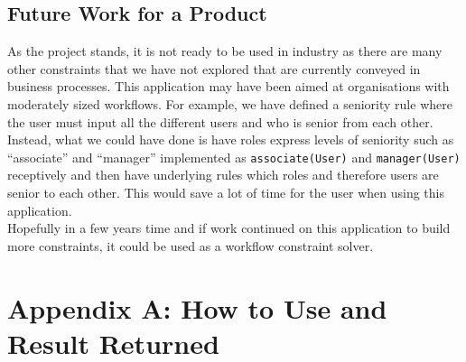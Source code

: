 \documentclass[a4paper]{report}
\begin{document}
\section{Future Work for a Product}
As the project stands, it is not ready to be used in industry as there are many other constraints that we have not explored that are currently conveyed in business processes. This application may have been aimed at organisations with moderately sized workflows. For example, we have defined a seniority rule where the user must input all the different users and who is senior from each other. Instead, what we could have done is have roles express levels of seniority such as ``associate'' and ``manager'' implemented as \texttt{associate(User)} and \texttt{manager(User)} receptively and then have underlying rules which roles and therefore users are senior to each other. This would save a lot of time for the user when using this application.\\

Hopefully in a few years time and if work continued on this application to build more constraints, it could be used as a workflow constraint solver. \\

\chapter{Appendix A: How to Use and Result Returned}


\end{document}
